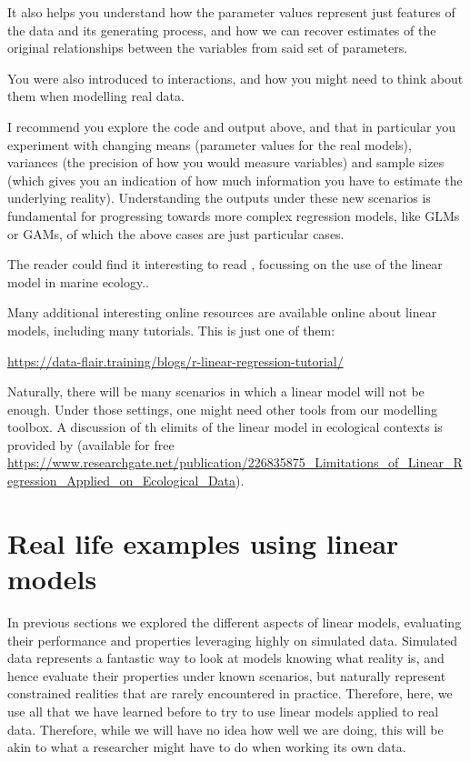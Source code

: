 \documentclass[
]{book}
\begin{document}
It also helps you understand how the parameter values represent just features of the data and its generating process, and how we can recover estimates of the original relationships between the variables from said set of parameters.

You were also introduced to interactions, and how you might need to think about them when modelling real data.

I recommend you explore the code and output above, and that in particular you experiment with changing means (parameter values for the real models), variances (the precision of how you would measure variables) and sample sizes (which gives you an indication of how much information you have to estimate the underlying reality). Understanding the outputs under these new scenarios is fundamental for progressing towards more complex regression models, like GLMs or GAMs, of which the above cases are just particular cases.

The reader could find it interesting to read \citet{Boldina2016}, focussing on the use of the linear model in marine ecology..

Many additional interesting online resources are available online about linear models, including many tutorials. This is just one of them:

\url{https://data-flair.training/blogs/r-linear-regression-tutorial/}

Naturally, there will be many scenarios in which a linear model will not be enough. Under those settings, one might need other tools from our modelling toolbox. A discussion of th elimits of the linear model in ecological contexts is provided by \citet{Zuur2009c} (available for free \href{here}{https://www.researchgate.net/publication/226835875\_Limitations\_of\_Linear\_Regression\_Applied\_on\_Ecological\_Data}).

\chapter{Real life examples using linear models}\label{LMinPractice}

In previous sections we explored the different aspects of linear models, evaluating their performance and properties leveraging highly on simulated data. Simulated data represents a fantastic way to look at models knowing what reality is, and hence evaluate their properties under known scenarios, but naturally represent constrained realities that are rarely encountered in practice. Therefore, here, we use all that we have learned before to try to use linear models applied to real data. Therefore, while we will have no idea how well we are doing, this will be akin to what a researcher might have to do when working its own data.
\end{document}
